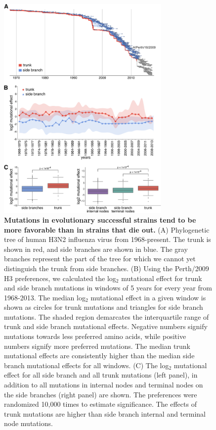 \documentclass[11pt]{article}
\begin{document}
\begin{figure}
\centerline{\includegraphics[width=0.75\textwidth]{figs/trunkvssidebranch/trunkvssidebranch.pdf}}
\caption{\label{fig:trunkvssidebranch}
{\bf Mutations in evolutionary successful strains tend to be more favorable than in strains that die out.}
(A) Phylogenetic tree of human H3N2 influenza virus from 1968-present. 
The trunk is shown in red, and side branches are shown in blue.
The gray branches represent the part of the tree for which we cannot yet distinguish the trunk from side branches.
(B) Using the Perth/2009 H3 preferences, we calculated the log$_{2}$ mutational effect for trunk and side branch mutations in windows of 5 years for every year from 1968-2013. 
The median log$_{2}$ mutational effect in a given window is shown as circles for trunk mutations and triangles for side branch mutations. 
The shaded region demarcates the interquartile range of trunk and side branch mutational effects.
Negative numbers signify mutations towards less preferred amino acids, while positive numbers signify more preferred mutations.
The median trunk mutational effects are consistently higher than the median side branch mutational effects for all windows.
(C) The log$_{2}$ mutational effect for all side branch and all trunk mutations (left panel), in addition to all mutations in internal nodes and terminal nodes on the side branches (right panel) are shown.
The preferences were randomized 10,000 times to estimate significance.
The effects of trunk mutations are higher than side branch internal and terminal node mutations.
}
\end{figure}
\end{document}
